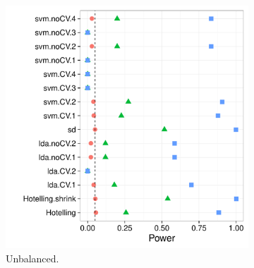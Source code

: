 \documentclass[12pt,a4paper]{article}
\begin{document}
\begin{figure}[h]
\centering
\label{fig:simulation_1}
\caption{\footnotesize
The power of a permutation test with various test statistics. 
The power on the $x$ axis. 
Effect are color and shape coded. They are assumed to be equal in all the $23$ dimensions, and vary over $0$ (red circle), $0.25$ (green triangle), and $0.5$ (blue square). 
The various statistics on the $y$ axis. Their details are given in Table~\ref{tab:collected}. 
Simulation code available at [TODO].}	

	\begin{subfigure}{.5\textwidth}
	  \centering
	  \includegraphics[width=1\linewidth]{"art/2016-07-26 20:55:48"}
	  \caption{Unbalanced.}  %
	\label{fig:simulation_11}
	\end{subfigure}%
	\begin{subfigure}{.5\textwidth}
	  \centering

\end{subfigure}
\end{figure}
\end{document}
